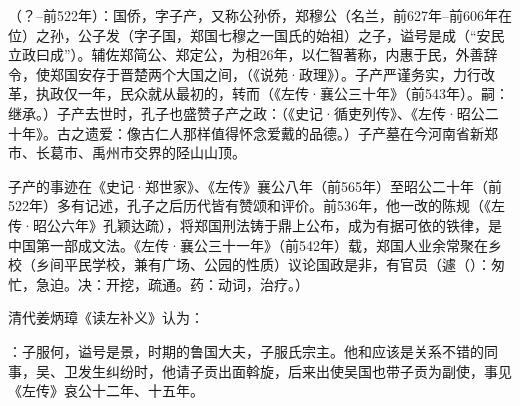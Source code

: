 （？--前522年）：国侨，字子产，又称公孙侨，郑穆公（名兰，前627年--前606年在位）之孙，公子发（字子国，郑国七穆之一国氏的始祖）之子，谥号是成（“安民立政曰成”）。辅佐郑简公、郑定公，为相26年，以仁智著称，内惠于民，外善辞令，使郑国安存于晋楚两个大国之间，（《说苑·政理》）。子产严谨务实，力行改革，执政仅一年，民众就从最初的，转而（《左传·襄公三十年》（前543年）。嗣：继承。）子产去世时，孔子也盛赞子产之政：（《史记·循吏列传》、《左传·昭公二十年》。古之遗爱：像古仁人那样值得怀念爱戴的品德。）子产墓在今河南省新郑市、长葛市、禹州市交界的陉山山顶。

子产的事迹在《史记·郑世家》、《左传》襄公八年（前565年）至昭公二十年（前522年）多有记述，孔子之后历代皆有赞颂和评价。前536年，他一改的陈规（《左传·昭公六年》孔颖达疏），将郑国刑法铸于鼎上公布，成为有据可依的铁律，是中国第一部成文法。《左传·襄公三十一年》（前542年）载，郑国人业余常聚在乡校（乡间平民学校，兼有广场、公园的性质）议论国政是非，有官员（遽（）：匆忙，急迫。决：开挖，疏通。药：动词，治疗。）

清代姜炳璋《读左补义》认为：

：子服何，谥号是景，时期的鲁国大夫，子服氏宗主。他和应该是关系不错的同事，吴、卫发生纠纷时，他请子贡出面斡旋，后来出使吴国也带子贡为副使，事见《左传》哀公十二年、十五年。

